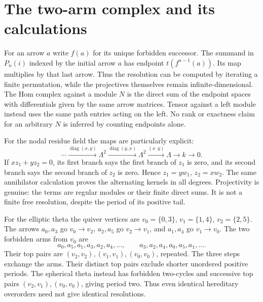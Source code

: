 \section{The two-arm complex and its calculations}
For an arrow $a$ write $f(a)$ for its unique forbidden successor. The summand in $P_n(i)$ indexed by the initial arrow $a$ has endpoint $t(f^{n-1}(a))$. Its map multiplies by that last arrow. Thus the resolution can be computed by iterating a finite permutation, while the projectives themselves remain infinite-dimensional. The Hom complex against a module $N$ is the direct sum of the endpoint spaces with differentials given by the same arrow matrices. Tensor against a left module instead uses the same path entries acting on the left. No rank or exactness claim for an arbitrary $N$ is inferred by counting endpoints alone.

For the nodal residue field the maps are particularly explicit:
\[
 \cdots\xrightarrow{\operatorname{diag}(x,y)}\Lambda^2
 \xrightarrow{\operatorname{diag}(y,x)}\Lambda^2
 \xrightarrow{(x\ \ y)}\Lambda\longrightarrow k\longrightarrow0.
\]
If $xz_1+yz_2=0$, its first branch says the first branch of $z_1$ is zero, and its second branch says the second branch of $z_2$ is zero. Hence $z_1=yw_1$, $z_2=xw_2$. The same annihilator calculation proves the alternating kernels in all degrees. Projectivity is genuine: the terms are regular modules or their finite direct sums. It is not a finite free resolution, despite the period of its positive tail.

For the elliptic theta the quiver vertices are $v_0=\{0,3\}$, $v_1=\{1,4\}$, $v_2=\{2,5\}$. The arrows $a_0,a_3$ go $v_0\to v_2$, $a_2,a_5$ go $v_2\to v_1$, and $a_1,a_4$ go $v_1\to v_0$. The two forbidden arms from $v_0$ are
\[
 a_0,a_5,a_1,a_3,a_2,a_4,\ldots,\qquad
 a_3,a_2,a_4,a_0,a_5,a_1,\ldots.
\]
Their top pairs are $(v_2,v_2),(v_1,v_1),(v_0,v_0)$, repeated. The three steps exchange the arms. Their distinct top pairs exclude shorter unordered positive periods. The spherical theta instead has forbidden two-cycles and successive top pairs $(v_2,v_1),(v_0,v_0)$, giving period two. Thus even identical hereditary overorders need not give identical resolutions.

